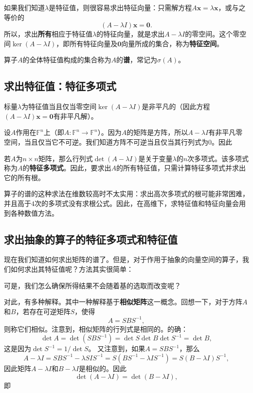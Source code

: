 如果我们知道$\lambda$是特征值，则很容易求出特征向量：只需解方程$A\mathbf{x}=\lambda\mathbf{x}$，或与之等价的\[(A-\lambda I)\mathbf{x}=\mathbf{0}.\]
所以，求出\textbf{所有}相应于特征值$\lambda$的特征向量，就是求出$A-\lambda I$的零空间。这个零空间$\ker(A-\lambda I)$，即所有特征向量及$\mathbf{0}$向量所成的集合，称为\textbf{特征空间}。

算子$A$的全体特征值构成的集合称为$A$的\textbf{谱}，常记为$\sigma(A)$。

\subsection{求出特征值：特征多项式}

标量$\lambda$为特征值当且仅当零空间$\ker(A-\lambda I)$是非平凡的（因此方程$(A-\lambda I)\mathbf{x}=\mathbf{0}$有非平凡解）。

设$A$作用在$\mathbb{F}^n$上（即$A:\mathbb{F}^n\to \mathbb{F}^n$）。因为$A$的矩阵是方阵，所以$A-\lambda I$有非平凡零空间，当且仅当它不可逆。我们知道方阵不可逆当且仅当其行列式为$0$。因此

\begin{center}
\end{center}

若$A$为$n\times n$矩阵，那么行列式$\det(A-\lambda I)$是关于变量$\lambda$的$n$次多项式。该多项式称为$A$的\textbf{特征多项式}。因此，要求出$A$的所有特征值，只需计算特征多项式并求出它的所有根。

算子的谱的这种求法在维数较高时不太实用：求出高次多项式的根可能非常困难，并且高于$4$次的多项式没有求根公式。因此，在高维下，求特征值和特征向量会用到各种数值方法。

\subsection{求出抽象的算子的特征多项式和特征值}

现在我们知道如何求出矩阵的谱了。但是，对于作用于抽象的向量空间的算子，我们如何求出其特征值呢？方法其实很简单：

\begin{center}
\end{center}

可是，我们怎么确保所得结果不会随着基的选取而改变呢？

对此，有多种解释。其中一种解释基于\textbf{相似矩阵}这一概念。回想一下，对于方阵$A$和$B$，若存在可逆矩阵$S$，使得\[A=SBS^{-1},\]
则称它们相似。注意到，相似矩阵的行列式是相同的。的确：
\[\det A=\det(SBS^{-1})=\det S\det B\det S^{-1}=\det B,\]
这是因为$\det S^{-1}=1/\det S$。
又注意到，如果$A=SBS^{-1}$，那么\[A-\lambda I=SBS^{-1}-\lambda SIS^{-1}=S(BS^{-1}-\lambda IS^{-1})=S(B-\lambda I)S^{-1},\]
因此矩阵$A-\lambda I$和$B-\lambda I$是相似的。因此\[\det(A-\lambda I)=\det(B-\lambda I),\]即

